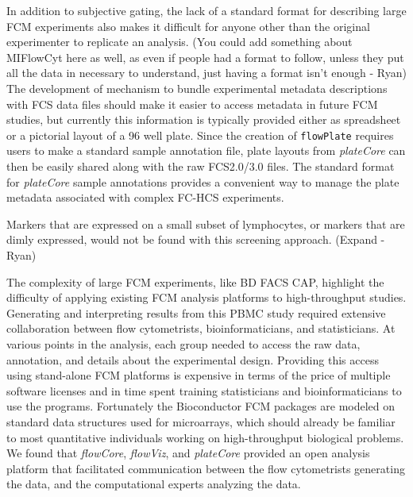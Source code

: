 \documentclass[12pt]{article}
\newcommand{\Robject}[1]{{\texttt{#1}}}
\newcommand{\Rpackage}[1]{{\textit{#1}}}
\begin{document}
In addition to subjective gating, the lack of a standard format for describing
large FCM experiments also makes it difficult for anyone other than the
original experimenter to replicate an analysis. (You could add something about
MIFlowCyt here as well, as even if people had a format to follow, unless they
put all the data in necessary to understand, just having a format isn't enough
- Ryan) The development of mechanism to bundle experimental metadata
descriptions with FCS data files should make it easier to access metadata in
future FCM studies, but currently this information is typically provided either
as spreadsheet or a pictorial layout of a 96 well plate. Since the creation of
\Robject{flowPlate} requires users to make a standard sample annotation file,
plate layouts from \Rpackage{plateCore} can then be easily shared along with
the raw FCS2.0/3.0 files. The standard format for \Rpackage{plateCore} sample
annotations provides a convenient way to manage the plate metadata associated
with complex FC-HCS experiments.



Markers that are expressed on a small subset of lymphocytes, or markers that
are dimly expressed, would not be found with this screening approach.
(Expand - Ryan)



The complexity of large FCM experiments, like BD FACS CAP, highlight the 
difficulty of applying existing FCM analysis platforms to high-throughput
studies. Generating and interpreting results from this PBMC study required
extensive collaboration between flow cytometrists, bioinformaticians, and
statisticians. At various points in the analysis, each group needed to access
the raw data, annotation, and details about the experimental design. Providing
this access using stand-alone FCM platforms is expensive in terms of the price
of multiple software licenses and in time spent training statisticians and
bioinformaticians to use the programs. Fortunately the Bioconductor FCM
packages are modeled on standard data structures used for microarrays, which
should already be familiar to most quantitative individuals working on
high-throughput biological problems. We found that \Rpackage{flowCore},
\Rpackage{flowViz}, and \Rpackage{plateCore} provided an open analysis platform
that facilitated communication between the flow cytometrists generating the
data, and the computational experts analyzing the data.



\end{document}
